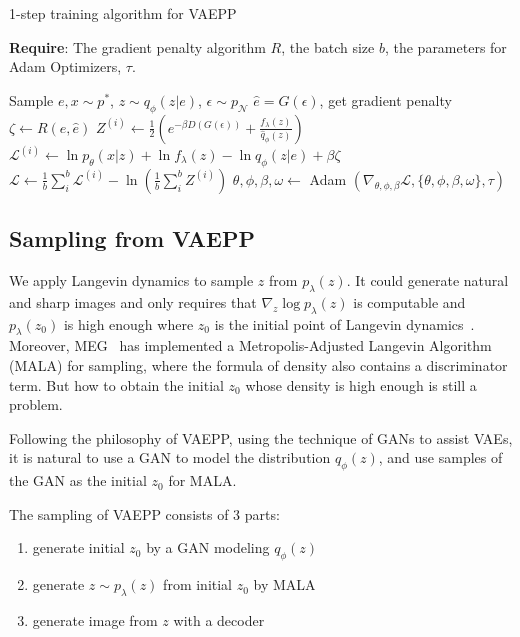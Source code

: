 \begin{algorithm}[tb]
\caption{1-step training algorithm for VAEPP}
\label{alg:improved_vaepp}
\textbf{Require}: The gradient penalty algorithm $R$, the batch size $b$, the parameters for Adam Optimizers, $\tau$. 

\begin{algorithmic}[1] %
\STATE Sample $e, x \sim p^*$, $z \sim q_\phi(z|e)$, $\epsilon \sim p_\mathcal{N}$
\STATE $\hat{e} = G(\epsilon)$, get gradient penalty $\zeta \gets R(e, \hat{e})$ 
\STATE $Z^{(i)} \gets \frac{1}{2}(e^{-\beta D(G(\epsilon))} + \frac{f_\lambda(z)}{\hat{q}_\phi(z)})$
\STATE $\mathcal{L}^{(i)} \gets \ln p_\theta(x|z) + \ln f_\lambda(z) - \ln q_\phi(z|e) + \beta \zeta$
\ENDFOR
\STATE $\mathcal{L} \gets \frac{1}{b}\sum_{i}^b \mathcal{L}^{(i)} - \ln (\frac{1}{b}\sum_{i}^b Z^{(i)})$
\STATE $\theta, \phi, \beta, \omega \gets $ Adam $(\nabla_{\theta, \phi, \beta} \mathcal{L}, \{\theta, \phi, \beta, \omega\}, \tau)$
\ENDWHILE
\end{algorithmic}
\end{algorithm}

\subsection{Sampling from VAEPP}
We apply Langevin dynamics to sample $z$ from $p_\lambda(z)$. It could generate natural and sharp images and only requires that $\nabla_z \log p_\lambda(z)$ is computable and $p_\lambda(z_0)$ is high enough where $z_0$ is the initial point of Langevin dynamics~\cite{song2019generative}. 
Moreover, MEG~\cite{kumar2019maximum} has implemented a Metropolis-Adjusted Langevin Algorithm (MALA) for sampling, where the formula of density also contains a discriminator term. 
But how to obtain the initial $z_0$ whose density is high enough is still a problem. 

Following the philosophy of VAEPP, \IE using the technique of GANs to assist VAEs, it is natural to use a GAN to model the distribution $q_\phi(z)$, and use samples of the GAN as the initial $z_0$ for MALA. 

The sampling of VAEPP consists of 3 parts: 
\begin{enumerate}
	\item generate initial $z_0$ by a GAN modeling $q_\phi(z)$
	\item generate $z \sim p_\lambda(z)$ from initial $z_0$ by MALA
	\item generate image from $z$ with a decoder
\end{enumerate}

